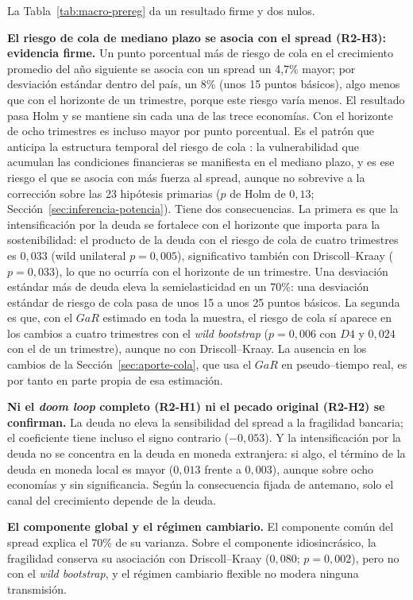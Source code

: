 La Tabla~\ref{tab:macro-prereg} da un resultado firme y dos nulos.

\textbf{El riesgo de cola de mediano plazo se asocia con el spread (R2-H3): evidencia firme.} Un punto porcentual más de riesgo de cola en el crecimiento promedio del año siguiente se asocia con un spread un 4,7\% mayor; por desviación estándar dentro del país, un 8\% (unos 15 puntos básicos), algo menos que con el horizonte de un trimestre, porque este riesgo varía menos. El resultado pasa Holm y se mantiene sin cada una de las trece economías. Con el horizonte de ocho trimestres es incluso mayor por punto porcentual. Es el patrón que anticipa la estructura temporal del riesgo de cola \citep{AdrianEtAl2022}: la vulnerabilidad que acumulan las condiciones financieras se manifiesta en el mediano plazo, y es ese riesgo el que se asocia con más fuerza al spread, aunque no sobrevive a la corrección sobre las 23 hipótesis primarias ($p$ de Holm de $0{,}13$; Sección~\ref{sec:inferencia-potencia}). Tiene dos consecuencias. La primera es que la intensificación por la deuda se fortalece con el horizonte que importa para la sostenibilidad: el producto de la deuda con el riesgo de cola de cuatro trimestres es $0{,}033$ (wild unilateral $p=0{,}005$), significativo también con Driscoll--Kraay ($p=0{,}033$), lo que no ocurría con el horizonte de un trimestre. Una desviación estándar más de deuda eleva la semielasticidad en un 70\%: una desviación estándar de riesgo de cola pasa de unos 15 a unos 25 puntos básicos. La segunda es que, con el $GaR$ estimado en toda la muestra, el riesgo de cola sí aparece en los cambios a cuatro trimestres con el \textit{wild bootstrap} ($p=0{,}006$ con $D4$ y $0{,}024$ con el de un trimestre), aunque no con Driscoll--Kraay. La ausencia en los cambios de la Sección~\ref{sec:aporte-cola}, que usa el $GaR$ en pseudo--tiempo real, es por tanto en parte propia de esa estimación.

\textbf{Ni el \textit{doom loop} completo (R2-H1) ni el pecado original (R2-H2) se confirman.} La deuda no eleva la sensibilidad del spread a la fragilidad bancaria; el coeficiente tiene incluso el signo contrario ($-0{,}053$). Y la intensificación por la deuda no se concentra en la deuda en moneda extranjera: si algo, el término de la deuda en moneda local es mayor ($0{,}013$ frente a $0{,}003$), aunque sobre ocho economías y sin significancia. Según la consecuencia fijada de antemano, solo el canal del crecimiento depende de la deuda.

\textbf{El componente global y el régimen cambiario.} El componente común del spread explica el 70\% de su varianza. Sobre el componente idiosincrásico, la fragilidad conserva su asociación con Driscoll--Kraay ($0{,}080$; $p=0{,}002$), pero no con el \textit{wild bootstrap}, y el régimen cambiario flexible no modera ninguna transmisión.


